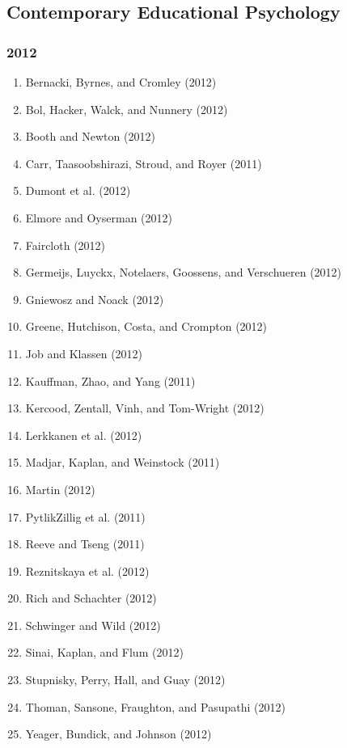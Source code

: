\documentclass[english,man]{apa6}
\providecommand{\tightlist}{%
  \setlength{\itemsep}{0pt}\setlength{\parskip}{0pt}}
\begin{document}
\subsection{Contemporary Educational
Psychology}\label{contemporary-educational-psychology}

\subsubsection{2012}\label{section-16}

\begin{enumerate}
\def\labelenumi{\arabic{enumi})}
\tightlist
\item
  Bernacki, Byrnes, and Cromley (2012)
\item
  Bol, Hacker, Walck, and Nunnery (2012)
\item
  Booth and Newton (2012)
\item
  Carr, Taasoobshirazi, Stroud, and Royer (2011)
\item
  Dumont et al. (2012)
\item
  Elmore and Oyserman (2012)
\item
  Faircloth (2012)
\item
  Germeijs, Luyckx, Notelaers, Goossens, and Verschueren (2012)
\item
  Gniewosz and Noack (2012)
\item
  Greene, Hutchison, Costa, and Crompton (2012)
\item
  Job and Klassen (2012)
\item
  Kauffman, Zhao, and Yang (2011)
\item
  Kercood, Zentall, Vinh, and Tom-Wright (2012)
\item
  Lerkkanen et al. (2012)
\item
  Madjar, Kaplan, and Weinstock (2011)
\item
  Martin (2012)
\item
  PytlikZillig et al. (2011)
\item
  Reeve and Tseng (2011)
\item
  Reznitskaya et al. (2012)
\item
  Rich and Schachter (2012)
\item
  Schwinger and Wild (2012)
\item
  Sinai, Kaplan, and Flum (2012)
\item
  Stupnisky, Perry, Hall, and Guay (2012)
\item
  Thoman, Sansone, Fraughton, and Pasupathi (2012)
\item
  Yeager, Bundick, and Johnson (2012)
\end{enumerate}
\end{document}
